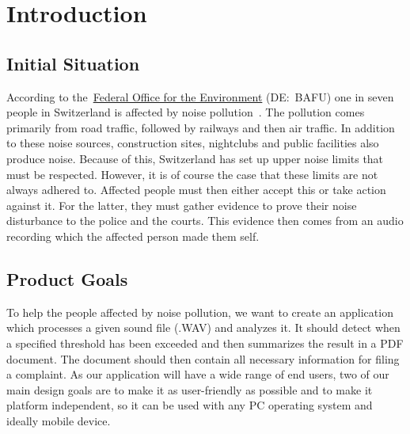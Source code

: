 \section{Introduction}\label{sec:introduction}

\subsection{Initial Situation}\label{subsec:initial-situation}
According to the~\href{https://www.bafu.admin.ch//}{Federal Office for the Environment} (DE:\ BAFU) one in seven people in Switzerland is affected by noise pollution~\cite{foen_noise_pollution}.
The pollution comes primarily from road traffic, followed by railways and then air traffic.
In addition to these noise sources, construction sites, nightclubs and public facilities also produce noise.
Because of this, Switzerland has set up upper noise limits that must be respected.
However, it is of course the case that these limits are not always adhered to.
Affected people must then either accept this or take action against it.
For the latter, they must gather evidence to prove their noise disturbance to the police and the courts.
This evidence then comes from an audio recording which the affected person made them self.

\subsection{Product Goals}\label{subsec:product-goals}
To help the people affected by noise pollution, we want to create an application which processes a given sound file (.WAV)
and analyzes it.
It should detect when a specified threshold has been exceeded and then summarizes the result in a PDF document.
The document should then contain all necessary information for filing a complaint.
As our application will have a wide range of end users, two of our main design goals are to make it as user-friendly as possible
and to make it platform independent, so it can be used with any PC operating system and ideally mobile device.

